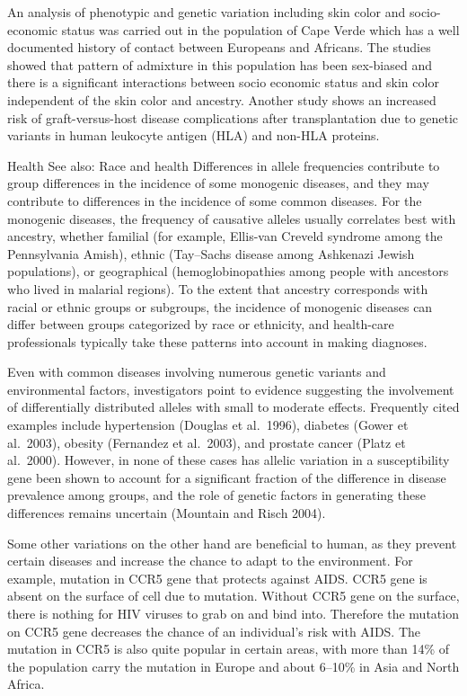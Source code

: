 An analysis of phenotypic and genetic variation including skin color and socio-economic status was carried out in the population of Cape Verde which has a well documented history of contact between Europeans and Africans. The studies showed that pattern of admixture in this population has been sex-biased and there is a significant interactions between socio economic status and skin color independent of the skin color and ancestry. Another study shows an increased risk of graft-versus-host disease complications after transplantation due to genetic variants in human leukocyte antigen (HLA) and non-HLA proteins.

Health
See also: Race and health
Differences in allele frequencies contribute to group differences in the incidence of some monogenic diseases, and they may contribute to differences in the incidence of some common diseases. For the monogenic diseases, the frequency of causative alleles usually correlates best with ancestry, whether familial (for example, Ellis-van Creveld syndrome among the Pennsylvania Amish), ethnic (Tay--Sachs disease among Ashkenazi Jewish populations), or geographical (hemoglobinopathies among people with ancestors who lived in malarial regions). To the extent that ancestry corresponds with racial or ethnic groups or subgroups, the incidence of monogenic diseases can differ between groups categorized by race or ethnicity, and health-care professionals typically take these patterns into account in making diagnoses.

Even with common diseases involving numerous genetic variants and environmental factors, investigators point to evidence suggesting the involvement of differentially distributed alleles with small to moderate effects. Frequently cited examples include hypertension (Douglas et al.~1996), diabetes (Gower et al.~2003), obesity (Fernandez et al.~2003), and prostate cancer (Platz et al.~2000). However, in none of these cases has allelic variation in a susceptibility gene been shown to account for a significant fraction of the difference in disease prevalence among groups, and the role of genetic factors in generating these differences remains uncertain (Mountain and Risch 2004).

Some other variations on the other hand are beneficial to human, as they prevent certain diseases and increase the chance to adapt to the environment. For example, mutation in CCR5 gene that protects against AIDS. CCR5 gene is absent on the surface of cell due to mutation. Without CCR5 gene on the surface, there is nothing for HIV viruses to grab on and bind into. Therefore the mutation on CCR5 gene decreases the chance of an individual's risk with AIDS. The mutation in CCR5 is also quite popular in certain areas, with more than 14\% of the population carry the mutation in Europe and about 6--10\% in Asia and North Africa.


